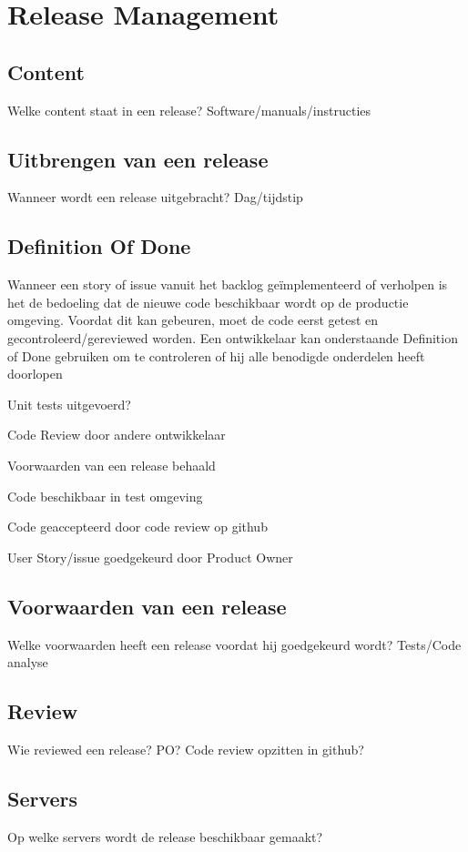 \chapter{Release Management}

\section{Content}
Welke content staat in een release? Software/manuals/instructies

\section{Uitbrengen van een release}
Wanneer wordt een release uitgebracht? Dag/tijdstip

\section{Definition Of Done}
Wanneer een story of issue vanuit het backlog geïmplementeerd of verholpen is het de bedoeling dat de nieuwe code beschikbaar wordt op de productie omgeving. Voordat dit kan gebeuren, moet de code eerst getest en gecontroleerd/gereviewed worden. Een ontwikkelaar kan onderstaande Definition of Done gebruiken om te controleren of hij alle benodigde onderdelen heeft doorlopen
	
	\begin{itemize}
		
	\end{itemize}

\section{Voorwaarden van een release}
Welke voorwaarden heeft een release voordat hij goedgekeurd wordt? Tests/Code analyse

\section{Review}
Wie reviewed een release? PO? Code review opzitten in github?

\section{Servers}
Op welke servers wordt de release beschikbaar gemaakt?